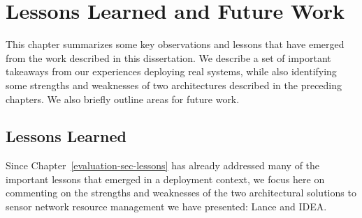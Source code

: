 \chapter{Lessons Learned and Future Work}
\label{chapter-lessons}

This chapter summarizes some key observations and lessons that have emerged
from the work described in this dissertation. We describe a set of important
takeaways from our experiences deploying real systems, while also identifying
some strengths and weaknesses of two architectures described in the preceding
chapters. We also briefly outline areas for future work.

\section{Lessons Learned}

Since Chapter~\ref{evaluation-sec-lessons} has already addressed many of the
important lessons that emerged in a deployment context, we focus here on
commenting on the strengths and weaknesses of the two architectural solutions
to sensor network resource management we have presented: Lance and IDEA.

